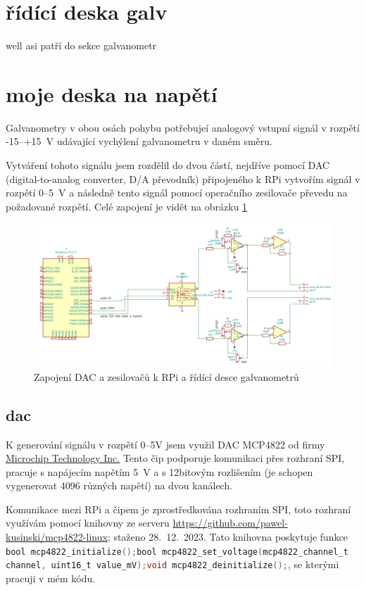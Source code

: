 \documentclass{template/socthesis}
\begin{document}
\section{řídící deska galv}
well asi patří do sekce galvanometr

\section{moje deska na napětí}
Galvanometry v obou osách pohybu potřebujeí analogový vstupní signál v rozpětí -15--+15~V udávající vychýlení galvanometru v daném směru.

Vytváření tohoto signálu jsem rozdělil do dvou částí, nejdříve pomocí DAC (digital-to-analog converter, D/A převodník) připojeného k RPi vytvořím signál v rozpětí 0--5~V a následně tento signál pomocí operačního zesilovače převedu na požadované rozpětí.
Celé zapojení je vidět na obrázku \ref{fig:dac_board}
\begin{figure}[!htb]
  \centering
  \includegraphics[width=1\textwidth]{img/dac_board.png} %
  \caption{\label{fig:dac_board}Zapojení DAC a zesilovačů k RPi a řídící desce galvanometrů}
\end{figure}

\subsection{dac}
K generování signálu v rozpětí 0--5V jsem využil DAC MCP4822 od firmy \href{https://www.microchip.com}{Microchip Technology Inc.}%
Tento čip podporuje komunikaci přes rozhraní SPI, pracuje s napájecím napětím 5~V a s 12bitovým rozlišením (je schopen vygenerovat 4096 různých napětí) na dvou kanálech.

Komunikace mezi RPi a čipem je zprostředkována rozhraním SPI, toto rozhraní využívám pomocí knihovny ze serveru \url{https://github.com/pawel-kusinski/mcp4822-linux}; staženo 28.~12.~2023. %
Tato knihovna poskytuje funkce \lstinline[language=C]!bool mcp4822_initialize();bool mcp4822_set_voltage(mcp4822_channel_t channel, uint16_t value_mV);void mcp4822_deinitialize();!, se kterými pracuji v mém kódu.
\end{document}
